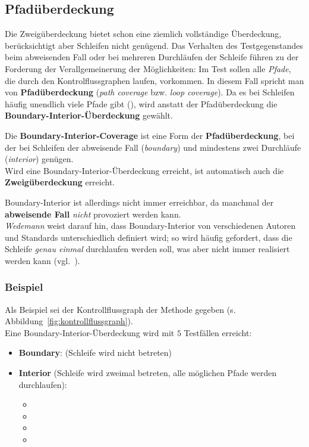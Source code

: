 \subsection{Pfadüberdeckung}
Die Zweigüberdeckung bietet schon eine ziemlich vollständige Überdeckung, berücksichtigt aber Schleifen nicht genügend.
Das Verhalten des Testgegenstandes beim abweisenden Fall oder bei mehreren Durchläufen der Schleife führen zu der Forderung der Verallgemeinerung der Möglichkeiten: Im Test sollen alle \textit{Pfade}, die durch den Kontrolflussgraphen laufen, vorkommen.
In diesem Fall spricht man von \textbf{Pfadüberdeckung} (\textit{path coverage} bzw. \textit{loop coverage}).
Da es bei Schleifen häufig unendlich viele Pfade gibt (\cite[52]{Wed09c}), wird anstatt der Pfadüberdeckung die \textbf{Boundary-Interior-Überdeckung} gewählt.

\begin{tcolorbox}[title=Boundary-Interior-Coverage]
    Die \textbf{Boundary-Interior-Coverage} ist eine Form der \textbf{Pfadüberdeckung}, bei der bei Schleifen der abweisende Fall (\textit{boundary}) und mindestens zwei Durchläufe (\textit{interior}) genügen.\\
    Wird eine Boundary-Interior-Überdeckung erreicht, ist automatisch auch die \textbf{Zweigüberdeckung} erreicht.
\end{tcolorbox}

\noindent
Boundary-Interior ist allerdings nicht immer erreichbar, da manchmal der \textbf{abweisende Fall} \textit{nicht} provoziert werden kann.\\
\textit{Wedemann} weist darauf hin, dass Boundary-Interior von verschiedenen Autoren und Standards unterschiedlich definiert wird; so wird häufig gefordert, dass die Schleife \textit{genau einmal} durchlaufen werden soll, was aber nicht immer realisiert werden kann (vgl.~\cite[52]{Wed09c}).

\subsubsection*{Beispiel}
Als Beispiel sei der Kontrollflussgraph der Methode  gegeben (s. Abbildung~\ref{fig:kontrollflussgraph}).\\
Eine Boundary-Interior-Überdeckung wird mit $5$ Testfällen erreicht:

\begin{itemize}
    \item \textbf{Boundary}:  (Schleife wird nicht betreten)
    \item \textbf{Interior} (Schleife wird zweimal betreten, alle möglichen Pfade werden durchlaufen):
    \begin{itemize}
        \item {}
        \item {}
        \item {}
        \item {}
    \end{itemize}
\end{itemize}

